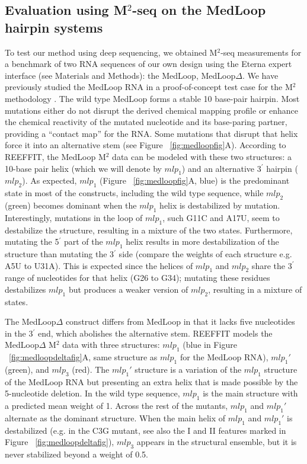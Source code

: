 \documentclass[12pt]{article}
\begin{document}
\subsection{Evaluation using M$^2$-seq on the MedLoop hairpin systems}
To test our method using deep sequencing, we obtained M$^2$-seq measurements for a benchmark of two RNA sequences of our own design using the Eterna expert interface (see Materials and Methods): the MedLoop, MedLoop$\Delta$.
 We have previously studied the MedLoop RNA in a proof-of-concept test case for the M$^2$ methodology \cite{Kladwang2011}. 
The wild type MedLoop forms a stable 10 base-pair hairpin. Most mutations either do not disrupt the derived chemical mapping profile or enhance the chemical reactivity of the mutated nucleotide and its base-paring partner, providing a ``contact map'' for the RNA. 
Some mutations that disrupt that helix force it into an alternative stem (see Figure ~\ref{fig:medloopfig}A). 
According to REEFFIT, the MedLoop M$^2$ data can be modeled with these two structures: a 10-base pair helix (which we will denote by $mlp_1$) and an alternative 3$^{\prime}$ hairpin ($mlp_2$). 
As expected, $mlp_1$ (Figure ~\ref{fig:medloopfig}A,  blue) is the predominant state in most of the constructs, including the wild type sequence, while $mlp_2$ (green) becomes dominant when the $mlp_1$ helix is destabilized by mutation. 
Interestingly, mutations in the loop of $mlp_1$, such G11C and A17U, seem to destabilize the structure, resulting in a mixture of the two states. 
Furthermore, mutating the 5$^{\prime}$ part of the $mlp_1$ helix results in more destabilization of the structure than mutating the 3$^{\prime}$ side (compare the weights of each structure e.g. A5U to U31A). 
This is expected since the helices of $mlp_1$ and $mlp_2$ share the 3$^{\prime}$ range of nucleotides for that helix (G26 to G34); mutating these residues destabilizes $mlp_1$ but produces a weaker version of $mlp_2$, resulting in a mixture of states. 

The MedLoop$\Delta$ construct differs from MedLoop in that it lacks five nucleotides in the 3$^{\prime}$ end, which abolishes the alternative stem. 
REEFFIT models the MedLoop$\Delta$ M$^2$ data with three structures: $mlp_1$ (blue in Figure ~\ref{fig:medloopdeltafig}A, same structure as $mlp_1$ for the MedLoop RNA), $mlp_1'$ (green), and $mlp_3$ (red). 
The $mlp_1'$ structure is a variation  of the $mlp_1$ structure of the MedLoop RNA but presenting an extra helix that is made possible by the 5-nucleotide deletion. 
In the wild type sequence, $mlp_1$ is the main structure with a predicted mean weight of 1. 
Across the rest of the mutants, $mlp_1$ and $mlp_1'$ alternate as the dominant structure.
When the main helix of $mlp_1$ and $mlp_1'$ is destabilized (e.g. in the C3G mutant, see also the I and II features marked in Figure ~\ref{fig:medloopdeltafig}), $mlp_3$ appears in the structural ensemble, but it is never stabilized beyond a weight of 0.5. 
\end{document}
